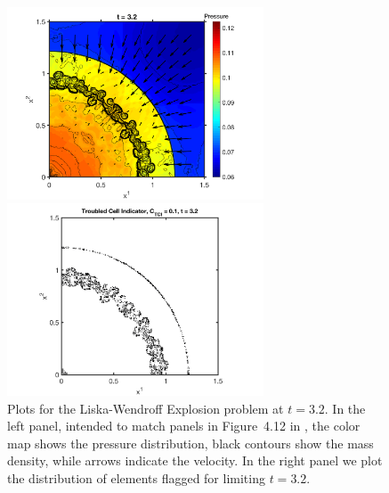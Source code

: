 \documentclass[letterpaper]{jpconf}
\begin{document}
\begin{figure}[h]
  \centering
  \begin{minipage}{18pc}
    \includegraphics[width=18pc]{./Figures/Explosion_Astronum_2018}
  \end{minipage}\hspace{0.5pc}%
  \begin{minipage}{18pc}
    \includegraphics[width=18pc]{./Figures/Explosion_TCI_Astronum_2018}
  \end{minipage}
  \caption{\label{fig:Explosion}Plots for the Liska-Wendroff Explosion problem at $t=3.2$.  In the left panel, intended to match panels in Figure~4.12 in \cite{liskaWendroff_2003}, the color map shows the pressure distribution, black contours show the mass density, while arrows indicate the velocity.  In the right panel we plot the distribution of elements flagged for limiting $t=3.2$.}
\end{figure}
\end{document}
